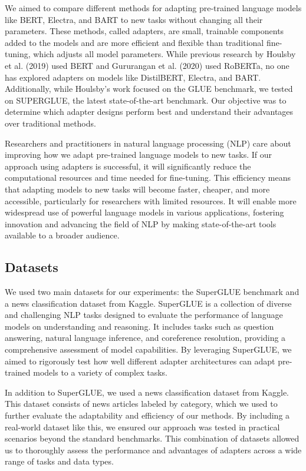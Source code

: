 \documentclass[10pt,twocolumn,letterpaper]{article}
\begin{document}
We aimed to compare different methods for adapting pre-trained language models like BERT, Electra, and BART to new tasks without changing all their parameters. These methods, called adapters, are small, trainable components added to the models and are more efficient and flexible than traditional fine-tuning, which adjusts all model parameters. While previous research by Houlsby et al. (2019) used BERT and Gururangan et al. (2020) used RoBERTa, no one has explored adapters on models like DistilBERT, Electra, and BART. Additionally, while Houlsby’s work focused on the GLUE benchmark, we tested on SUPERGLUE, the latest state-of-the-art benchmark. Our objective was to determine which adapter designs perform best and understand their advantages over traditional methods.

Researchers and practitioners in natural language processing (NLP) care about improving how we adapt pre-trained language models to new tasks. If our approach using adapters is successful, it will significantly reduce the computational resources and time needed for fine-tuning. This efficiency means that adapting models to new tasks will become faster, cheaper, and more accessible, particularly for researchers with limited resources. It will enable more widespread use of powerful language models in various applications, fostering innovation and advancing the field of NLP by making state-of-the-art tools available to a broader audience.

\subsection{Datasets}
We used two main datasets for our experiments: the SuperGLUE benchmark and a news classification dataset from Kaggle. SuperGLUE is a collection of diverse and challenging NLP tasks designed to evaluate the performance of language models on understanding and reasoning. It includes tasks such as question answering, natural language inference, and coreference resolution, providing a comprehensive assessment of model capabilities. By leveraging SuperGLUE, we aimed to rigorously test how well different adapter architectures can adapt pre-trained models to a variety of complex tasks.

In addition to SuperGLUE, we used a news classification dataset from Kaggle. This dataset consists of news articles labeled by category, which we used to further evaluate the adaptability and efficiency of our methods. By including a real-world dataset like this, we ensured our approach was tested in practical scenarios beyond the standard benchmarks. This combination of datasets allowed us to thoroughly assess the performance and advantages of adapters across a wide range of tasks and data types.
\end{document}
